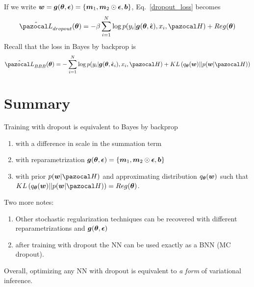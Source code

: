 If we write $\boldsymbol{w}=\boldsymbol{g}(\boldsymbol{\theta},\boldsymbol{\epsilon}) = \{\boldsymbol{m}_1, \boldsymbol{m}_2\odot \boldsymbol{\epsilon}, \boldsymbol{b}\}$, Eq.~\eqref{dropout_loss} becomes
\begin{equation}\label{}
\hat{\cL}_{dropout}(\bth) = -\beta\sum_{i = 1}^{N} \log p(y_i|\boldsymbol{g}(\bth,\hat{\boldsymbol{\epsilon}}),x_i,\cH) + Reg(\bth)
\end{equation}
Recall that the loss in Bayes by backprop is
\begin{equation}\label{update}
\hat{\cL}_{BBB}(\bth)= -\sum_{i=1}^{N} \log p(y_i|\boldsymbol{g}(\bth, \hat{\boldsymbol{\epsilon}}_i),x_i,\cH) + KL\left(q_{\bth}(\bw)||p(\bw|\cH)\right)
\end{equation}

\section{Summary}
Training with dropout is equivalent to Bayes by backprop 
\begin{enumerate}
	\item with a difference in scale in the summation term
	\item with reparametrization $\boldsymbol{g}(\boldsymbol{\theta},\boldsymbol{\epsilon}) = \{\boldsymbol{m}_1, \boldsymbol{m}_2\odot \boldsymbol{\epsilon}, \boldsymbol{b}\}$
	\item with prior $p(\bw|\cH)$ and approximating distribution $q_{\boldsymbol{\theta}}(\boldsymbol{w})$ such that $KL\left(q_{\bth}(\bw)||p(\bw|\cH)\right) = Reg(\bth) $.
\end{enumerate}

Two more notes:
\begin{enumerate}
	\item Other stochastic regularization techniques can be recovered with different reparametrizations and  $\boldsymbol{g}(\boldsymbol{\theta},\boldsymbol{\epsilon})$
	\item after training with dropout the NN can be used exactly as a BNN (MC dropout).
\end{enumerate}

Overall, optimizing any NN with dropout is equivalent to \textit{a form} of variational inference. 


\newpage	
\printbibliography[heading=bibintoc,title={References}]
	
